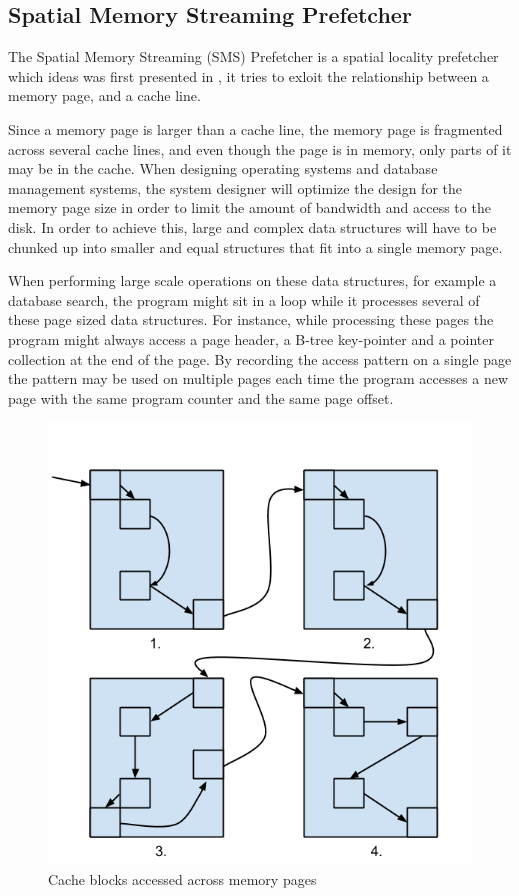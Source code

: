 \subsection{Spatial Memory Streaming Prefetcher}
\label{sec:smsPrefetcher}

The Spatial Memory Streaming (SMS) Prefetcher is a spatial locality
prefetcher which ideas was first presented in \cite{SMS}, it tries to
exloit the relationship between a memory page, and a cache line.

Since a memory page is larger than a cache line, the memory page is
fragmented across several cache lines, and even though the page is in
memory, only parts of it may be in the cache.  When designing
operating systems and database management systems, the system designer
will optimize the design for the memory page size in order to limit
the amount of bandwidth and access to the disk. In order to achieve
this, large and complex data structures will have to be chunked up into
smaller and equal structures that fit into a single memory page.

When performing large scale operations on these data structures, for
example a database search, the program might sit in a loop while it
processes several of these page sized data structures. For instance,
while processing these pages the program might always access a page
header, a B-tree key-pointer and a pointer collection at the end of
the page. By recording the access pattern on a single page the pattern may
be used on multiple pages each time the program accesses a new page
with the same program counter and the same page offset.

\begin{figure}[H]
  \centering
  \includegraphics[scale=0.35]{./figures/sms_pattern.png}
  \caption{Cache blocks accessed across memory pages}
  \label{fig:sms_pattern}
\end{figure}

